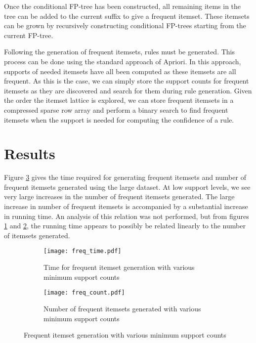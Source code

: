 \documentclass[11pt]{article}
\begin{document}
Once the conditional FP-tree has been constructed, all remaining items in the tree can be added to the current suffix to give a frequent itemset.
These itemsets can be grown by recursively constructing conditional FP-trees starting from the current FP-tree.

Following the generation of frequent itemsets, rules must be generated. This process can be done using the standard approach of Apriori. In this
approach, supports of needed itemsets have all been computed as these itemsets are all frequent. As this is the case, we can simply store the support
counts for frequent itemsets as they are discovered and search for them during rule generation. Given the order the itemset lattice is explored, we
can store frequent itemsets in a compressed sparse row array and perform a binary search to find frequent itemsets when the support is needed for
computing the confidence of a rule.

\section{Results}

Figure \ref{fig:freq} gives the time required for generating frequent itemsets and number of frequent itemsets generated using the large dataset. At
low support levels, we see very large increases in the number of frequent itemsets generated. The large increase in number of frequent itemsets is
accompanied by a substantial increase in running time. An analysis of this relation was not performed, but from figures \ref{fig:freq_time} and
\ref{fig:freq_count}, the running time appears to possibly be related linearly to the number of itemsets generated.

\begin{figure}[h!]
  \centering
  \begin{subfigure}[t]{0.45\textwidth}
    \centering
    \texttt{[image: freq\_time.pdf]}
    \caption{Time for frequent itemset generation with various minimum support counts}
    \label{fig:freq_time}
  \end{subfigure}
  \begin{subfigure}[t]{0.45\textwidth}
    \centering
    \texttt{[image: freq\_count.pdf]}
    \caption{Number of frequent itemsets generated with various minimum support counts}
    \label{fig:freq_count}
  \end{subfigure}
  \caption{Frequent itemset generation with various minimum support counts}
  \label{fig:freq}
\end{figure}
\end{document}

